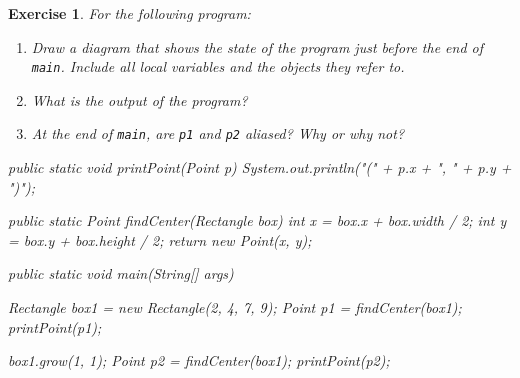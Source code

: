 \documentclass[12pt]{book}
\theoremstyle{exercise}
\newtheorem{exercise}{Exercise}[chapter]
\newcommand{\java}[1]{\verb"#1"}
\begin{document}
\begin{exercise}
For the following program:

\begin{enumerate}

\item Draw a diagram that shows the state of the program just before the end of \java{main}.
Include all local variables and the objects they refer to.

\item What is the output of the program?

\item At the end of \java{main}, are \java{p1} and \java{p2} aliased?
Why or why not?

\end{enumerate}

\begin{code}
    public static void printPoint(Point p) {
        System.out.println("(" + p.x + ", " + p.y + ")");
    }

    public static Point findCenter(Rectangle box) {
        int x = box.x + box.width / 2;
        int y = box.y + box.height / 2;
        return new Point(x, y);
    }

    public static void main(String[] args) {
        Rectangle box1 = new Rectangle(2, 4, 7, 9);
        Point p1 = findCenter(box1);
        printPoint(p1);

        box1.grow(1, 1);
        Point p2 = findCenter(box1);
        printPoint(p2);
    }
\end{code}

\end{exercise}
\end{document}
